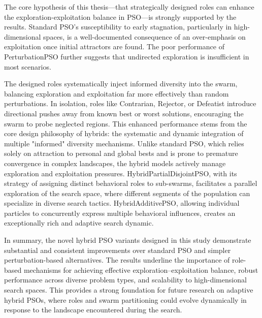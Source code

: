The core hypothesis of this thesis---that strategically designed roles can enhance the exploration-exploitation balance in PSO---is strongly supported by the results.
Standard PSO's susceptibility to early stagnation, particularly in high-dimensional spaces, is a well-documented consequence of an over-emphasis on exploitation once initial attractors are found. The poor performance of PerturbationPSO further suggests that undirected exploration is insufficient in most scenarios.

The designed roles systematically inject informed diversity into the swarm, balancing exploration and exploitation far more effectively than random perturbations. In isolation, roles like Contrarian, Rejector, or Defeatist introduce directional pushes away from known best or worst solutions, encouraging the swarm to probe neglected regions.
This enhanced performance stems from the core design philosophy of  hybrids: the systematic and dynamic integration of multiple "informed" diversity mechanisms. Unlike standard PSO, which relies solely on attraction to personal and global bests and is prone to premature convergence in complex landscapes, the hybrid models actively manage exploration and exploitation pressures. HybridPartialDisjointPSO, with its strategy of assigning distinct behavioral roles to sub-swarms, facilitates a parallel exploration of the search space, where different segments of the population can specialize in diverse search tactics. HybridAdditivePSO, allowing individual particles to concurrently express multiple behavioral influences, creates an exceptionally rich and adaptive search dynamic.

In summary, the novel hybrid PSO variants designed in this study demonstrate substantial and consistent improvements over standard PSO and simpler perturbation-based alternatives. The results underline the importance of role-based mechanisms for achieving effective exploration–exploitation balance, robust performance across diverse problem types, and scalability to high-dimensional search spaces. This provides a strong foundation for future research on adaptive hybrid PSOs, where roles and swarm partitioning could evolve dynamically in response to the landscape encountered during the search.